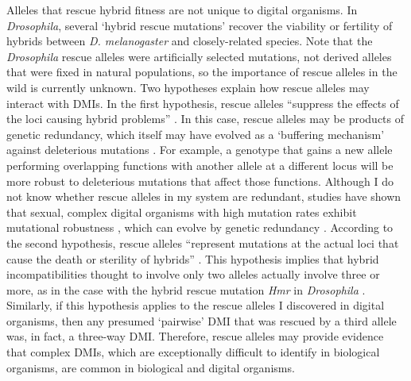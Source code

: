 \begin{doublespace}
Alleles that rescue hybrid fitness are not unique to digital organisms.
%
In \emph{Drosophila}, several `hybrid rescue mutations'
recover the viability or fertility
of hybrids between \emph{D. melanogaster} and closely-related species.
%
Note that the \emph{Drosophila} rescue alleles
were artificially selected mutations,
not derived alleles that were fixed in natural populations,
so the importance of rescue alleles in the wild is currently unknown.
%
Two hypotheses explain how rescue alleles
may interact with DMIs.
%
In the first hypothesis, rescue alleles
``suppress the effects of the loci causing hybrid problems'' \citep{coy04}.
%
In this case, rescue alleles may be products of genetic redundancy,
which itself may have evolved as a `buffering mechanism'
against deleterious mutations \citep{wag99,ele06}.
%
For example, a genotype that gains a new allele performing
overlapping functions with another allele at a different locus
will be more robust to deleterious mutations that affect those functions.
%
Although I do not know whether rescue alleles in my system are redundant,
studies have shown that sexual, complex digital organisms
with high mutation rates exhibit mutational robustness \citep{len99,wil01,mis06},
which can evolve by genetic redundancy \citep{ele07}.
%
According to the second hypothesis, rescue alleles
``represent mutations at the actual loci
that cause the death or sterility of hybrids'' \citep{coy04}.
%
This hypothesis implies that hybrid incompatibilities
thought to involve only two alleles actually involve three or more,
as in the case with the hybrid rescue mutation
\emph{Hmr} in \emph{Drosophila} \citep{bar00,orr00}.
%
Similarly, if this hypothesis applies
to the rescue alleles I discovered in digital organisms,
then any presumed `pairwise' DMI that was rescued by a third allele
was, in fact, a three-way DMI.
%
Therefore, rescue alleles may provide evidence that complex DMIs,
which are exceptionally difficult to identify in biological organisms,
are common in biological and digital organisms.



\end{doublespace}
